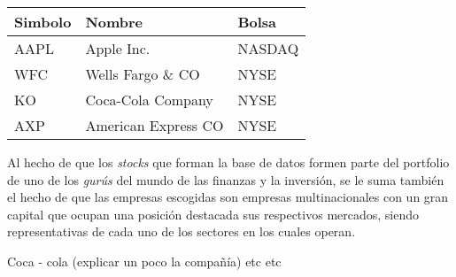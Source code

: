 \documentclass[]{article}
\newenvironment{Shaded}{\begin{snugshade}}{\end{snugshade}}
\newcommand{\DataTypeTok}[1]{\textcolor[rgb]{0.13,0.29,0.53}{#1}}
\newcommand{\DecValTok}[1]{\textcolor[rgb]{0.00,0.00,0.81}{#1}}
\newcommand{\KeywordTok}[1]{\textcolor[rgb]{0.13,0.29,0.53}{\textbf{#1}}}
\newcommand{\NormalTok}[1]{#1}
\newcommand{\OperatorTok}[1]{\textcolor[rgb]{0.81,0.36,0.00}{\textbf{#1}}}
\newcommand{\StringTok}[1]{\textcolor[rgb]{0.31,0.60,0.02}{#1}}
\begin{document}
\begin{Shaded}
\end{Shaded}

\begin{table}[H]
\centering\begingroup\fontsize{10}{12}\selectfont

\begin{tabular}{l|l|l}
\hline
Simbolo & Nombre & Bolsa\\
\hline
AAPL & Apple Inc. & NASDAQ\\
\hline
WFC & Wells Fargo \& CO & NYSE\\
\hline
KO & Coca-Cola Company & NYSE\\
\hline
AXP & American Express CO & NYSE\\
\hline
\end{tabular}\endgroup{}
\end{table}
\centering

\setlength\parskip{5ex}
\justifying

Al hecho de que los \emph{stocks} que forman la base de datos formen
parte del portfolio de uno de los \emph{gurús} del mundo de las finanzas
y la inversión, se le suma también el hecho de que las empresas
escogidas son empresas multinacionales con un gran capital que ocupan
una posición destacada sus respectivos mercados, siendo representativas
de cada uno de los sectores en los cuales operan.

Coca - cola (explicar un poco la compañía) etc etc
\end{document}
